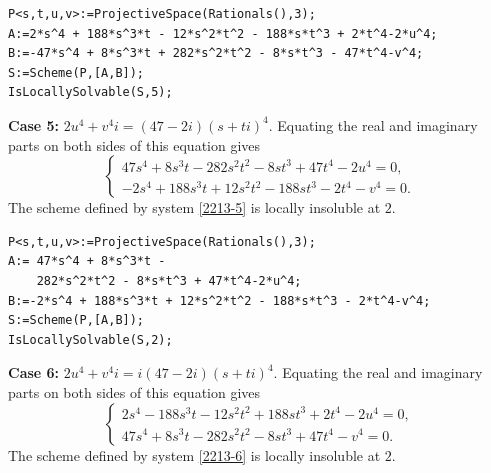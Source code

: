 \documentclass[a4paper,12pt,english,reqno]{amsart}
\begin{document}

\begin{lstlisting}
P<s,t,u,v>:=ProjectiveSpace(Rationals(),3);
A:=2*s^4 + 188*s^3*t - 12*s^2*t^2 - 188*s*t^3 + 2*t^4-2*u^4;
B:=-47*s^4 + 8*s^3*t + 282*s^2*t^2 - 8*s*t^3 - 47*t^4-v^4;
S:=Scheme(P,[A,B]);
IsLocallySolvable(S,5);
\end{lstlisting}

{\bf Case 5:} $2u^4+v^4i=(47-2i)(s+ti)^4$. Equating the real and imaginary parts on both sides of this equation gives
\begin{equation}\label{2213-5}
\begin{cases}
47s^4 + 8s^3t - 282s^2t^2 - 8st^3 + 47t^4 - 2u^4=0,\\
-2s^4 + 188s^3t + 12s^2t^2 - 188st^3 - 2t^4 - v^4=0.
\end{cases}
\end{equation}
The scheme defined by system \eqref{2213-5} is locally insoluble at $2$.


\begin{lstlisting}
P<s,t,u,v>:=ProjectiveSpace(Rationals(),3);
A:= 47*s^4 + 8*s^3*t -
    282*s^2*t^2 - 8*s*t^3 + 47*t^4-2*u^4;
B:=-2*s^4 + 188*s^3*t + 12*s^2*t^2 - 188*s*t^3 - 2*t^4-v^4;
S:=Scheme(P,[A,B]);
IsLocallySolvable(S,2);
\end{lstlisting}

{\bf Case 6:} $2u^4+v^4i=i(47-2i)(s+ti)^4$. Equating the real and imaginary parts on both sides of this equation gives
\begin{equation}\label{2213-6}
\begin{cases}
2s^4 - 188s^3t - 12s^2t^2 + 188st^3 + 2t^4 - 2u^4=0,\\
47s^4 + 8s^3t - 282s^2t^2 - 8st^3 + 47t^4 - v^4=0.
\end{cases}
\end{equation}
The scheme defined by system \eqref{2213-6} is locally insoluble at $2$.
\end{document}
